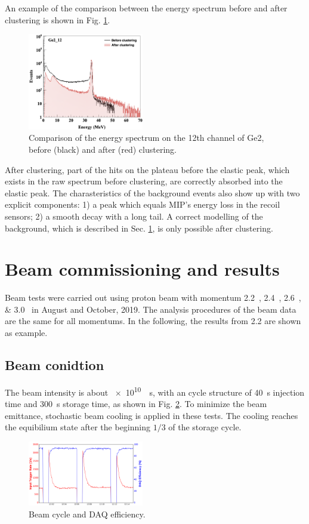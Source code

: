 \documentclass[number,5p]{elsarticle}
\begin{document}
An example of the comparison between the energy spectrum before and after clustering is shown in
Fig. \ref{fig:clustering}.
\begin{figure}[h]
  \centering
  \includegraphics[width=0.45\textwidth]{./clustering.png}
  \caption{Comparison of the energy spectrum on the 12th channel of Ge2, before (black) and after
    (red) clustering.}
  \label{fig:clustering}
\end{figure}
After clustering, part of the hits on the plateau before the elastic peak, which exists in the raw spectrum before clustering, are correctly absorbed into the elastic peak.
The charasteristics of the background events also show up with two explicit
components: 1) a peak which equals MIP's energy loss in the recoil sensors; 2) a smooth decay with a long tail.
A correct modelling of the background, which is described in Sec.
\ref{sec:result}, is only possible after clustering.

\section{Beam commissioning and results}
\label{sec:result}

Beam tests were carried out using proton beam with momentum
\SIlist[list-units=single]{2.2;2.4;2.6;3.0}{\momentum} in August and October, 2019.
The analysis procedures of the beam data are the same for all momentums.
In the following, the results from \SI{2.2}{\momentum} are shown as example.

\subsection{Beam conidtion}
\label{beam}
The beam intensity is about \SI[per-mode=reciprocal]{e10}{\per\second}, with an cycle structure of
\SI{40}{\second} injection time and \SI{300}{\second} storage time, as shown in Fig. \ref{fig:beam}.
To minimize the beam emittance, stochastic beam cooling is applied in these
tests.
The cooling reaches the equibilium state after the beginning $1/3$ of the storage cycle.
\begin{figure}[h]
  \centering
  \includegraphics[width=0.45\textwidth]{./daq_efficiency.png}
  \caption{Beam cycle and DAQ efficiency.}
  \label{fig:beam}
\end{figure}
\end{document}
